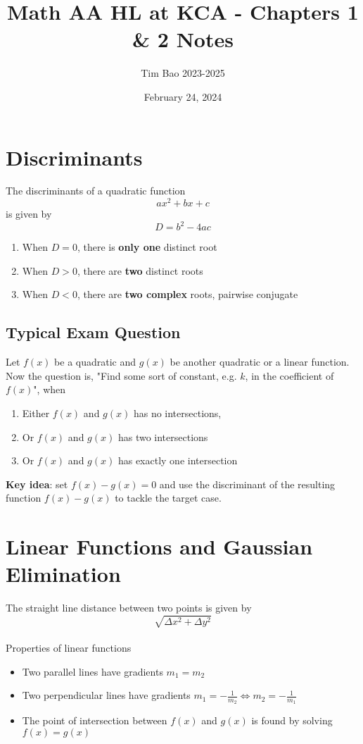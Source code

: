 \documentclass[11pt]{article}
\title{Math AA HL at KCA - Chapters 1 \& 2 Notes}
\author{Tim Bao 2023-2025}
\date{February 24, 2024}
\newcommand{\lb}{\\[8pt]}
\begin{document}
\maketitle
\pagebreak

\section{Discriminants}

The discriminants of a quadratic function $$ax^2 + bx + c$$ is given by $$D = b^2 - 4ac$$
\begin{enumerate}
  \item When $D = 0$, there is \textbf{only one} distinct root
  \item When $D > 0$, there are \textbf{two} distinct roots
  \item When $D < 0$, there are \textbf{two complex} roots, pairwise conjugate
\end{enumerate}

\subsection*{Typical Exam Question}

Let $f(x)$ be a quadratic and $g(x)$ be another quadratic or a linear function. Now the question is, "Find some sort of constant, e.g. $k$, in the coefficient of $f(x)$", when

\begin{enumerate}
  \item Either $f(x)$ and $g(x)$ has no intersections,
  \item Or $f(x)$ and $g(x)$ has two intersections
  \item Or $f(x)$ and $g(x)$ has exactly one intersection
\end{enumerate}
\textbf{Key idea}: set $f(x) - g(x) = 0$ and use the discriminant of the resulting function $f(x) - g(x)$ to tackle the target case.

\pagebreak

\section{Linear Functions and Gaussian Elimination}

The straight line distance between two points is given by $$\sqrt{\Delta x^2 + \Delta y^2}$$\lb
Properties of linear functions
\begin{itemize}
  \item Two parallel lines have gradients $m_1 = m_2$
  \item Two perpendicular lines have gradients $m_1 = -\frac{1}{m_2} \iff m_2 = -\frac{1}{m_1}$
  \item The point of intersection between $f(x)$ and $g(x)$ is found by solving $f(x) = g(x)$
\end{itemize}
\end{document}

